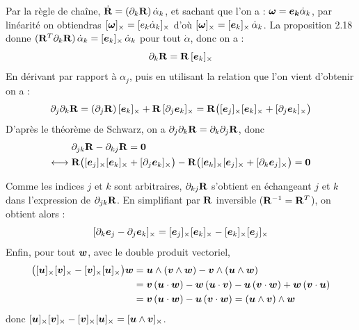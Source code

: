 \begin{demonstration}
    Par la règle de chaîne, $\dot{\mathbf{R}} = (\partial_k\mathbf{R})\,
    \dot\alpha_k$, et sachant que l'on a : $\bm{\omega} = \bm{e_k} \dot{\alpha}_k$, par linéarité on obtiendras $[\bm{\omega}]_{\times} = [e_k \dot{\alpha}_k]_{\times}$ d'où $[\bm{\omega}]_{\times} = [\bm{e}_k]_{\times}\,
    \dot\alpha_k$. La proposition 2.18 donne
    $(\mathbf{R}^T\partial_k\mathbf{R})\,\dot\alpha_k
    = [\bm{e}_k]_{\times}\,\dot\alpha_k$ pour tout $\dot\alpha$, donc on a : 
    \[
        \partial_k\mathbf{R} = \mathbf{R}\,[\bm{e}_k]_{\times}
    \]
    En dérivant par rapport à $\alpha_j$, puis en utilisant la relation que l'on vient d'obtenir on a : 
    \[
        \partial_j\partial_k\mathbf{R}
        = (\partial_j\mathbf{R})\,[\bm{e}_k]_{\times}
        + \mathbf{R}\,[\partial_j\bm{e}_k]_{\times}
        = \mathbf{R}\bigl([\bm{e}_j]_{\times}[\bm{e}_k]_{\times}
        + [\partial_j\bm{e}_k]_{\times}\bigr)
    \]
    D'après le théorème de Schwarz, on a
    $\partial_j\partial_k\mathbf{R} = \partial_k\partial_j\mathbf{R}$, donc
    \[
        \begin{aligned}
            &\partial_{jk}\mathbf{R} - \partial_{kj}\mathbf{R} = \mathbf{0}\\
            \longleftrightarrow\;
            &\mathbf{R}\bigl([\bm{e}_j]_{\times}[\bm{e}_k]_{\times}
            + [\partial_j\bm{e}_k]_{\times}\bigr)
            - \mathbf{R}\bigl([\bm{e}_k]_{\times}[\bm{e}_j]_{\times}
            + [\partial_k\bm{e}_j]_{\times}\bigr) = \mathbf{0}
        \end{aligned}
    \]

    Comme les indices $j$ et $k$ sont arbitraires, $\partial_{kj}\mathbf{R}$
    s'obtient en échangeant $j$ et $k$ dans l'expression de
    $\partial_{jk}\mathbf{R}$. En simplifiant par $\mathbf{R}$ inversible
    ($\mathbf{R}^{-1} = \mathbf{R}^T$), on obtient alors :
    \[
        [\partial_k\bm{e}_j - \partial_j\bm{e}_k]_{\times}
        = [\bm{e}_j]_{\times}[\bm{e}_k]_{\times}
        - [\bm{e}_k]_{\times}[\bm{e}_j]_{\times}
    \]
    Enfin, pour tout $\bm{w}$, avec le double produit vectoriel,
    \[
        \begin{aligned}
            \bigl([\bm{u}]_{\times}[\bm{v}]_{\times}
            - [\bm{v}]_{\times}[\bm{u}]_{\times}\bigr)\bm{w}
            &= \bm{u}\wedge(\bm{v}\wedge\bm{w})
            - \bm{v}\wedge(\bm{u}\wedge\bm{w})\\
            &= \bm{v}\,(\bm{u}\cdot\bm{w})
            - \bm{w}\,(\bm{u}\cdot\bm{v})
            - \bm{u}\,(\bm{v}\cdot\bm{w})
            + \bm{w}\,(\bm{v}\cdot\bm{u})\\
            &= \bm{v}\,(\bm{u}\cdot\bm{w})
            - \bm{u}\,(\bm{v}\cdot\bm{w})
            = (\bm{u}\wedge\bm{v})\wedge\bm{w}
        \end{aligned}
    \]
    donc $[\bm{u}]_{\times}[\bm{v}]_{\times} - [\bm{v}]_{\times}[\bm{u}]_{\times}
    = [\bm{u}\wedge\bm{v}]_{\times}$.
\end{demonstration}

